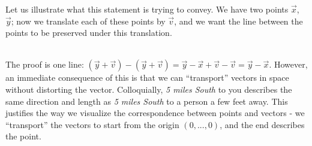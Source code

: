Let us illustrate what this statement is trying to convey. We have two points $\vec{x}$, $\vec{y}$; now we translate each of these points by $\vec{v}$, and we want the line between the points to be preserved under this translation.\\
 \ \\
The proof is one line: $(\vec{y}+\vec{v}) - (\vec{y}+\vec{v}) = \vec{y}-\vec{x} +\vec{v}-\vec{v}=\vec{y}-\vec{x}$. However, an immediate consequence of this is that we can ``transport'' vectors in space without distorting the vector. Colloquially, \textit{5 miles South} to you describes the same direction and length as \textit{5 miles South} to a person a few feet away. This justifies the way we visualize the correspondence between points and vectors - we ``transport'' the vectors to start from the origin $(0,...,0)$, and the end describes the point.

